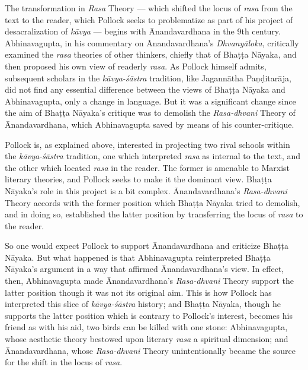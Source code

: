 The transformation in \textsl{Rasa} Theory --- which shifted the locus of \textsl{rasa} from the text to the reader, which Pollock seeks to problematize as part of his project of desacralization of \textsl{kāvya} --- begins with Ānandavardhana in the 9th century. Abhinavagupta, in his commentary on Ānandavardhana's \textsl{Dhvanyāloka}, critically examined the \textsl{rasa} theories of other thinkers, chiefly that of Bhaṭṭa Nāyaka, and then proposed his own view of readerly \textsl{rasa}. As Pollock himself admits, subsequent scholars in the \textsl{kāvya-śāstra} tradition, like Jagannātha Paṇḍitarāja, did not find any essential difference between the views of Bhaṭṭa Nāyaka and Abhinavagupta, only a change in language. But it was a significant change since the aim of Bhaṭṭa Nāyaka's critique was to demolish the \textsl{Rasa-dhvani} Theory of Ānandavardhana, which Abhinavagupta saved by means of his counter-critique. 

Pollock is, as explained above, interested in projecting two rival schools within the \textsl{kāvya-śāstra} tradition, one which interpreted \textsl{rasa} as internal to the text, and the other which located \textsl{rasa} in the reader. The former is amenable to Marxist literary theories, and Pollock seeks to make it the dominant view. Bhaṭṭa Nāyaka's role in this project is a bit complex. Ānandavardhana's \textsl{Rasa-dhvani} Theory accords with the former position which Bhaṭṭa Nāyaka tried to demolish, and in doing so, established the latter position by transferring the locus of \textsl{rasa} to the reader. 

So one would expect Pollock to support Ānandavardhana and criticize Bhaṭṭa Nāyaka. But what happened is that Abhinavagupta reinterpreted Bhaṭṭa Nāyaka's argument in a way that affirmed Ānandavardhana's view. In effect, then, Abhinavagupta made Ānandavardhana's \textsl{Rasa-dhvani} Theory support the latter position though it was not its original aim. This is how Pollock has interpreted this slice of \textsl{kāvya-śāstra} history; and Bhaṭṭa Nāyaka, though he supports the latter position which is contrary to Pollock's interest, becomes his friend as with his aid, two birds can be killed with one stone: Abhinavagupta, whose aesthetic theory bestowed upon literary \textsl{rasa} a spiritual dimension; and Ānandavardhana, whose \textsl{Rasa-dhvani} Theory unintentionally became the source for the shift in the locus of \textsl{rasa}. 

